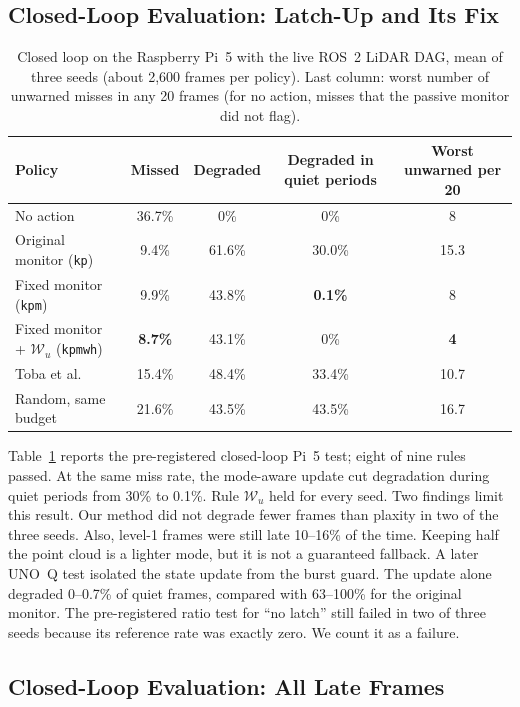 \documentclass[acmsmall,screen]{acmart}
\newcommand{\pol}[1]{\texttt{#1}}
\newcommand{\Wu}{$\mathcal{W}_u$}
\begin{document}
\subsection{Closed-Loop Evaluation: Latch-Up and Its Fix}\label{sec:eval-latch}

\begin{table}[t]
\caption{Closed loop on the Raspberry Pi~5 with the live ROS~2 LiDAR DAG, mean of three seeds (about 2{,}600 frames per policy). Last
column: worst number of unwarned misses in any 20 frames (for no action, misses that the passive monitor did not flag).}
\label{tab:latch}
\footnotesize
\begin{tabular}{@{}lcccc@{}}
\toprule
Policy & Missed & Degraded & Degraded in quiet periods & Worst unwarned per 20 \\
\midrule
No action & 36.7\% & 0\% & 0\% & 8 \\
Original monitor (\pol{kp}) & 9.4\% & 61.6\% & 30.0\% & 15.3 \\
Fixed monitor (\pol{kpm}) & 9.9\% & 43.8\% & \textbf{0.1\%} & 8 \\
Fixed monitor + \Wu{} (\pol{kpmwh}) & \textbf{8.7\%} & 43.1\% & 0\% & \textbf{4} \\
Toba et al.~\cite{toba2026} & 15.4\% & 48.4\% & 33.4\% & 10.7 \\
Random, same budget & 21.6\% & 43.5\% & 43.5\% & 16.7 \\
\bottomrule
\end{tabular}
\end{table}

Table~\ref{tab:latch} reports the pre-registered closed-loop Pi~5 test; eight of nine rules passed. At the same miss rate, the mode-aware update cut degradation during quiet periods from 30\% to 0.1\%. Rule \Wu{} held for every seed. Two findings limit this result. Our method did not degrade fewer frames than plaxity in two of the three seeds. Also, level-1 frames were still late 10--16\% of the time. Keeping half the point cloud is a lighter mode, but it is not a guaranteed fallback. A later UNO~Q test isolated the state update from the burst guard. The update alone degraded 0--0.7\% of quiet frames, compared with 63--100\% for the original monitor. The pre-registered ratio test for ``no latch'' still failed in two of three seeds because its reference rate was exactly zero. We count it as a failure.

\subsection{Closed-Loop Evaluation: All Late Frames}\label{sec:eval-all}
\end{document}
